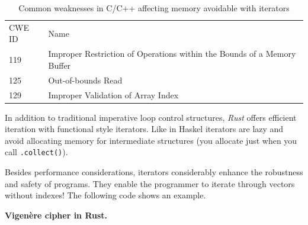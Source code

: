 \begin{longtable}[]{@{}ll@{}}
\caption{Common weaknesses in C/C++ affecting memory avoidable with
iterators}\tabularnewline
\toprule
\begin{minipage}[t]{0.19\columnwidth}\raggedright\strut
CWE ID\strut
\end{minipage} & \begin{minipage}[t]{0.75\columnwidth}\raggedright\strut
Name\strut
\end{minipage}\tabularnewline
\begin{minipage}[t]{0.19\columnwidth}\raggedright\strut
119\strut
\end{minipage} & \begin{minipage}[t]{0.75\columnwidth}\raggedright\strut
Improper Restriction of Operations within the Bounds of a Memory
Buffer\strut
\end{minipage}\tabularnewline
\begin{minipage}[t]{0.19\columnwidth}\raggedright\strut
125\strut
\end{minipage} & \begin{minipage}[t]{0.75\columnwidth}\raggedright\strut
Out-of-bounds Read\strut
\end{minipage}\tabularnewline
\begin{minipage}[t]{0.19\columnwidth}\raggedright\strut
129\strut
\end{minipage} & \begin{minipage}[t]{0.75\columnwidth}\raggedright\strut
Improper Validation of Array Index\strut
\end{minipage}\tabularnewline
\bottomrule
\end{longtable}

In addition to traditional imperative loop control structures,
\emph{Rust} offers efficient iteration with functional style iterators.
Like in Haskel iterators are lazy and avoid allocating memory for
intermediate structures (you allocate just when you call
\texttt{.collect()}).

Besides performance considerations, iterators considerably enhance the
robustness and safety of programs. They enable the programmer to iterate
through vectors without indexes! The following code shows an example.

\textbf{Vigenère cipher in Rust.}

\begin{Shaded}
\begin{Highlighting}[]
\NormalTok{<}
  \NormalTok{<}\NormalTok{> = }\NormalTok{[];     }

  
         \NormalTok{);}
    \NormalTok{\}}
\end{Highlighting}
\end{Shaded}

